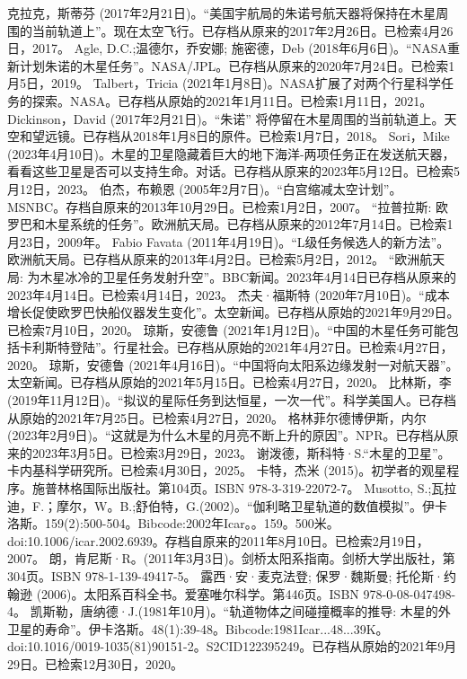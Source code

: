 \begin{enumerate}
 克拉克，斯蒂芬 (2017年2月21日)。“美国宇航局的朱诺号航天器将保持在木星周围的当前轨道上”。现在太空飞行。已存档从原来的2017年2月26日。已检索4月26日，2017。
 Agle, D.C.;温德尔，乔安娜; 施密德，Deb (2018年6月6日)。“NASA重新计划朱诺的木星任务”。NASA/JPL。已存档从原来的2020年7月24日。已检索1月5日，2019。
 Talbert，Tricia (2021年1月8日)。NASA扩展了对两个行星科学任务的探索。NASA。已存档从原始的2021年1月11日。已检索1月11日，2021。
 Dickinson，David (2017年2月21日)。“朱诺” 将停留在木星周围的当前轨道上。天空和望远镜。已存档从2018年1月8日的原件。已检索1月7日，2018。
 Sori，Mike (2023年4月10日)。木星的卫星隐藏着巨大的地下海洋-两项任务正在发送航天器，看看这些卫星是否可以支持生命。对话。已存档从原来的2023年5月12日。已检索5月12日，2023。
 伯杰，布赖恩 (2005年2月7日)。“白宫缩减太空计划”。MSNBC。存档自原来的2013年10月29日。已检索1月2日，2007。
 “拉普拉斯: 欧罗巴和木星系统的任务”。欧洲航天局。已存档从原来的2012年7月14日。已检索1月23日，2009年。
 Fabio Favata (2011年4月19日)。“L级任务候选人的新方法”。欧洲航天局。已存档从原来的2013年4月2日。已检索5月2日，2012。
 “欧洲航天局: 为木星冰冷的卫星任务发射升空”。BBC新闻。2023年4月14日已存档从原来的2023年4月14日。已检索4月14日，2023。
 杰夫·福斯特 (2020年7月10日)。“成本增长促使欧罗巴快船仪器发生变化”。太空新闻。已存档从原始的2021年9月29日。已检索7月10日，2020。
 琼斯，安德鲁 (2021年1月12日)。“中国的木星任务可能包括卡利斯特登陆”。行星社会。已存档从原始的2021年4月27日。已检索4月27日，2020。
 琼斯，安德鲁 (2021年4月16日)。“中国将向太阳系边缘发射一对航天器”。太空新闻。已存档从原始的2021年5月15日。已检索4月27日，2020。
 比林斯，李 (2019年11月12日)。“拟议的星际任务到达恒星，一次一代”。科学美国人。已存档从原始的2021年7月25日。已检索4月27日，2020。
 格林菲尔德博伊斯，内尔 (2023年2月9日)。“这就是为什么木星的月亮不断上升的原因”。NPR。已存档从原来的2023年3月5日。已检索3月29日，2023。
 谢泼德，斯科特·S.“木星的卫星”。卡内基科学研究所。已检索4月30日，2025。
 卡特，杰米 (2015)。初学者的观星程序。施普林格国际出版社。第104页。ISBN 978-3-319-22072-7。
 Musotto, S.;瓦拉迪，F.；摩尔，W。B.;舒伯特，G.(2002)。“伽利略卫星轨道的数值模拟”。伊卡洛斯。159(2):500-504。Bibcode:2002年Icar。。159。500米。doi:10.1006/icar.2002.6939。存档自原来的2011年8月10日。已检索2月19日，2007。
 朗，肯尼斯·R。(2011年3月3日)。剑桥太阳系指南。剑桥大学出版社，第304页。ISBN 978-1-139-49417-5。
 露西·安·麦克法登; 保罗·魏斯曼; 托伦斯·约翰逊 (2006)。太阳系百科全书。爱塞唯尔科学。第446页。ISBN 978-0-08-047498-4。
 凯斯勒，唐纳德·J.(1981年10月)。“轨道物体之间碰撞概率的推导: 木星的外卫星的寿命”。伊卡洛斯。48(1):39-48。Bibcode:1981Icar...48...39K。doi:10.1016/0019-1035(81)90151-2。S2CID122395249。已存档从原始的2021年9月29日。已检索12月30日，2020。 

\end{enumerate}
